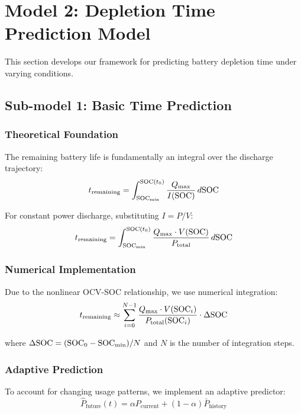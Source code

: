 \section{Model 2: Depletion Time Prediction Model}

This section develops our framework for predicting battery depletion time under varying conditions.

\subsection{Sub-model 1: Basic Time Prediction}

\subsubsection{Theoretical Foundation}

The remaining battery life is fundamentally an integral over the discharge trajectory:
\begin{equation}
t_{\text{remaining}} = \int_{\text{SOC}_{\min}}^{\text{SOC}(t_0)} \frac{Q_{\max}}{I(\text{SOC})} \, d\text{SOC}
\label{eq:remaining_time_integral}
\end{equation}

For constant power discharge, substituting $I = P/V$:
\begin{equation}
t_{\text{remaining}} = \int_{\text{SOC}_{\min}}^{\text{SOC}(t_0)} \frac{Q_{\max} \cdot V(\text{SOC})}{P_{\text{total}}} \, d\text{SOC}
\label{eq:constant_power}
\end{equation}

\subsubsection{Numerical Implementation}

Due to the nonlinear OCV-SOC relationship, we use numerical integration:
\begin{equation}
t_{\text{remaining}} \approx \sum_{i=0}^{N-1} \frac{Q_{\max} \cdot V(\text{SOC}_i)}{P_{\text{total}}(\text{SOC}_i)} \cdot \Delta\text{SOC}
\label{eq:numerical_integration}
\end{equation}

where $\Delta\text{SOC} = (\text{SOC}_0 - \text{SOC}_{\min})/N$ and $N$ is the number of integration steps.

\subsubsection{Adaptive Prediction}

To account for changing usage patterns, we implement an adaptive predictor:
\begin{equation}
\hat{P}_{\text{future}}(t) = \alpha P_{\text{current}} + (1-\alpha) \bar{P}_{\text{history}}
\label{eq:adaptive_power}
\end{equation}


